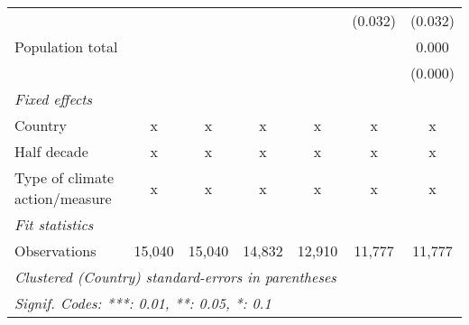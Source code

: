 \begin{tabular}{lcccccc}
                                               &              &             &         &             & (0.032) & (0.032)\\   
   Population total                            &              &             &         &             &         & 0.000\\   
                                               &              &             &         &             &         & (0.000)\\   
   \emph{Fixed effects}\\
   Country                                     & x            & x           & x       & x           & x       & x\\  
   Half decade                                 & x            & x           & x       & x           & x       & x\\  
   Type of climate action/measure              & x            & x           & x       & x           & x       & x\\  
   \midrule \emph{Fit statistics}\\
   Observations                                & 15,040       & 15,040      & 14,832  & 12,910      & 11,777  & 11,777\\  
   \midrule
   \multicolumn{7}{l}{\emph{Clustered (Country) standard-errors in parentheses}}\\
   \multicolumn{7}{l}{\emph{Signif. Codes: ***: 0.01, **: 0.05, *: 0.1}}\\
\end{tabular}
\par\endgroup


